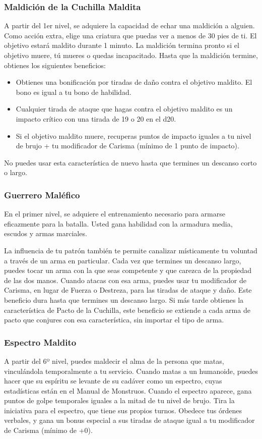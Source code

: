 \documentclass[a4paper,twocolumn,openany,10pt]{dndbook}
\begin{document}
\subsubsection{Maldición de la Cuchilla Maldita}
A partir del 1er nivel, se adquiere la capacidad de echar una maldición a alguien. Como acción extra, elige una criatura que
puedas ver a menos de 30 pies de ti. El objetivo estará maldito durante 1 minuto. La maldición termina pronto si el objetivo
muere, tú mueres o quedas incapacitado. Hasta que la maldición termine, obtienes los siguientes beneficios:

\begin{itemize}
	\item Obtienes una bonificación por tiradas de daño contra el objetivo maldito. El bono es igual a tu bono de habilidad.
	\item Cualquier tirada de ataque que hagas contra el objetivo maldito es un impacto crítico con una tirada de 19 o 20 en el
		d20.
	\item Si el objetivo maldito muere, recuperas puntos de impacto iguales a tu nivel de brujo + tu modificador de Carisma (mínimo
		de 1 punto de impacto).
\end{itemize}

No puedes usar esta característica de nuevo hasta que termines un descanso corto o largo. 

\subsubsection{Guerrero Maléfico}
En el primer nivel, se adquiere el entrenamiento necesario para armarse eficazmente para la batalla. Usted gana habilidad con
la armadura media, escudos y armas marciales.

La influencia de tu patrón también te permite canalizar místicamente tu voluntad a través de un arma en particular. Cada vez
que termines un descanso largo, puedes tocar un arma con la que seas competente y que carezca de la propiedad de las dos manos.
Cuando atacas con esa arma, puedes usar tu modificador de Carisma, en lugar de Fuerza o Destreza, para las tiradas de ataque y
daño. Este beneficio dura hasta que termines un descanso largo. Si más tarde obtienes la característica de Pacto de la Cuchilla,
este beneficio se extiende a cada arma de pacto que conjures con esa característica, sin importar el tipo de arma. 

\subsubsection{Espectro Maldito}
A partir del 6º nivel, puedes maldecir el alma de la persona que matas, vinculándola temporalmente a tu servicio. Cuando matas
a un humanoide, puedes hacer que su espíritu se levante de su cadáver como un espectro, cuyas estadísticas están en el Manual de
Monstruos. Cuando el espectro aparece, gana puntos de golpe temporales iguales a la mitad de tu nivel de brujo. Tira la
iniciativa para el espectro, que tiene sus propios turnos. Obedece tus órdenes verbales, y gana un bonus especial a sus tiradas
de ataque igual a tu modificador de Carisma (mínimo de +0).
\end{document}
